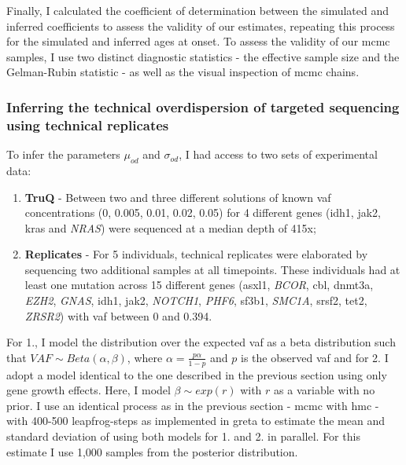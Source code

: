 Finally, I calculated the coefficient of determination between the simulated and inferred coefficients to assess the validity of our estimates, repeating this process for the simulated and inferred ages at onset. To assess the validity of our \ac{mcmc} samples, I use two distinct diagnostic statistics - the effective sample size and the Gelman-Rubin statistic \cite{Gelman1992-zo} - as well as the visual inspection of \ac{mcmc} chains.

\subsubsection{Inferring the technical overdispersion of targeted sequencing using technical replicates}

To infer the parameters $\mu_{od}$ and $\sigma_{od}$, I had access to two sets of experimental data:

\begin{enumerate}
	\item \textbf{TruQ} - Between two and three different solutions of known \ac{vaf} concentrations (0, 0.005, 0.01, 0.02, 0.05) for 4 different genes (\ac{idh1}, \ac{jak2}, \ac{kras} and \textit{NRAS}) were sequenced at a median depth of 415x;
	
	\item \textbf{Replicates} - For 5 individuals, technical replicates were elaborated by sequencing two additional samples at all timepoints. These individuals had at least one mutation across 15 different genes (\ac{asxl1}, \textit{BCOR}, \ac{cbl}, \ac{dnmt3a}, \textit{EZH2}, \textit{GNAS}, \ac{idh1}, \ac{jak2}, \textit{NOTCH1}, \textit{PHF6}, \ac{sf3b1}, \textit{SMC1A}, \ac{srsf2}, \ac{tet2}, \textit{ZRSR2}) with \ac{vaf} between 0 and 0.394. 
\end{enumerate}

For 1., I model the distribution over the expected \ac{vaf} as a beta distribution such that $VAF \sim Beta(\alpha,\beta)$, where $\alpha=\frac{p\alpha}{1-p}$ and $p$ is the observed \ac{vaf} and for 2. I adopt a model identical to the one described in the previous section using only gene growth effects. Here, I model $\beta \sim exp(r)$ with $r$ as a variable with no prior. I use an identical process as in the previous section - \ac{mcmc} with \ac{hmc} - with 400-500 leapfrog-steps as implemented in greta \cite{Golding2019-wh} to estimate the mean and standard deviation of  using both models for 1. and 2. in parallel. For this estimate I use 1,000 samples from the posterior distribution.


